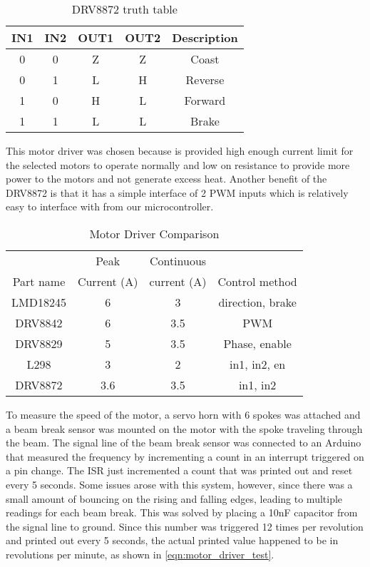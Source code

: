 \begin{table}[H]
	\centering
	\caption{DRV8872 truth table}
	\begin{tabular}{| c | c | c | c| c |}
		\hline
		IN1 & IN2 & OUT1 & OUT2 & Description \\
		\hline
		0 & 0 & Z & Z & Coast \\
		0 & 1 & L & H & Reverse \\
		1 & 0 & H & L & Forward \\
		1 & 1 & L & L & Brake \\
		\hline
	\end{tabular}
	\label{tbl:drv8872-truth6}
\end{table}

\noindent This motor driver was chosen because is provided high enough current limit for the selected motors to operate normally and low on resistance to provide more power to the motors and not generate excess heat. Another benefit of the DRV8872 is that it has a simple interface of 2 PWM inputs which is relatively easy to interface with from our microcontroller.
 
\begin{table}[H]
	\centering
	\caption{Motor Driver Comparison}
\begin{tabular}{|c|c|c|c|}
	\hline
	 & Peak & Continuous & \\
	Part name  & Current (A) & current (A) & Control method \\
	\hline
	
	LMD18245 & 6 & 3 & direction, brake \\
	
	DRV8842 & 6 & 3.5 & PWM \\
	
	DRV8829 & 5 & 3.5 & Phase, enable \\
	
	L298 & 3 & 2 & in1, in2, en \\
	
	DRV8872 & 3.6 & 3.5 & in1, in2 \\
	\hline
	\end{tabular}

	\label{tbl:Motor Driver Comparison}
\end{table}

\noindent To measure the speed of the motor, a servo horn with 6 spokes was attached and a beam break sensor was mounted on the motor with the spoke traveling through the beam. The signal line of the beam break sensor was connected to an Arduino that measured the frequency by incrementing a count in an interrupt triggered on a pin change. The ISR just incremented a count that was printed out and reset every 5 seconds. Some issues arose with this system, however, since there was a small amount of bouncing on the rising and falling edges, leading to multiple readings for each beam break. This was solved by placing a 10nF capacitor from the signal line to ground. Since this number was triggered 12 times per revolution and printed out every 5 seconds, the actual printed value happened to be in revolutions per minute, as shown in \ref{eqn:motor_driver_test}.

